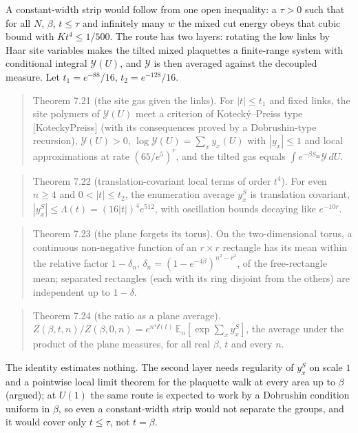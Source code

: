 \documentclass[10pt,letterpaper,twocolumn]{article}
\begin{document}
A constant-width strip would follow from one open inequality: a \(\tau>0\) such that for all \(N\), \(\beta\), \(t\le\tau\) and infinitely many \(w\) the mixed cut energy obeys that cubic bound with \(Kt^4\le1/500\). The route has two layers: rotating the low links by Haar site variables makes the tilted mixed plaquettes a finite-range system with conditional integral \(\mathcal Y(U)\), and \(\mathcal Y\) is then averaged against the decoupled measure. Let \(t_1=e^{-88}/16\), \(t_2=e^{-128}/16\).

\begin{quote}
Theorem 7.21 (the site gas given the links). For \(|t|\le t_1\) and fixed links, the site polymers of \(\mathcal Y(U)\) meet a criterion of Kotecký--Preiss type {[}KoteckyPreiss{]} (with its consequences proved by a Dobrushin-type recursion), \(\mathcal Y(U)>0\), \(\log\mathcal Y(U)=\sum_xy_x(U)\) with \(|y_x|\le1\) and local approximations at rate \((65/e^5)^r\), and the tilted gas equals \(\int e^{-\beta S_{\mathrm{in}}}\mathcal Y\,dU\).
\end{quote}

\begin{quote}
Theorem 7.22 (translation-covariant local terms of order \(t^4\)). For even \(n\ge4\) and \(0<|t|\le t_2\), the enumeration average \(y^S_x\) is translation covariant, \(|y^S_x|\le\Lambda(t)=(16|t|)^4e^{512}\), with oscillation bounds decaying like \(e^{-10r}\).
\end{quote}

\begin{quote}
Theorem 7.23 (the plane forgets its torus). On the two-dimensional torus, a continuous non-negative function of an \(r\times r\) rectangle has its mean within the relative factor \(1-\delta_n\), \(\delta_n=(1-e^{-4\beta})^{n^2-r^2}\), of the free-rectangle mean; separated rectangles (each with its ring disjoint from the others) are independent up to \(1-\delta\).
\end{quote}

\begin{quote}
Theorem 7.24 (the ratio as a plane average). \(Z(\beta,t,n)/Z(\beta,0,n)=e^{n^4\mathcal l(t)}\,\mathbb E_n[\exp\sum_xy^S_x]\), the average under the product of the plane measures, for all real \(\beta\), \(t\) and every \(n\).
\end{quote}

The identity estimates nothing. The second layer needs regularity of \(y^S_x\) on scale \(1\) and a pointwise local limit theorem for the plaquette walk at every area up to \(\beta\) (argued); at \(U(1)\) the same route is expected to work by a Dobrushin condition uniform in \(\beta\), so even a constant-width strip would not separate the groups, and it would cover only \(t\le\tau\), not \(t=\beta\).
\end{document}
